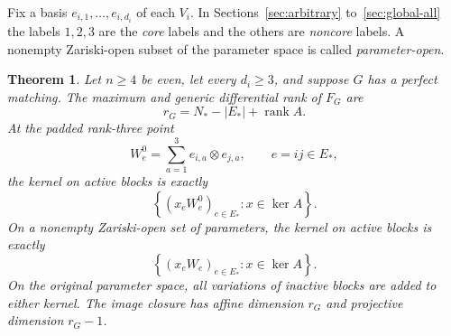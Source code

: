 \documentclass[11pt]{article}
\newtheorem{theorem}{Theorem}[section]
\theoremstyle{remark}\newtheorem{remark}[theorem]{Remark}
\DeclareMathOperator{\rank}{rank}
\begin{document}
Fix a basis $e_{i,1},\ldots,e_{i,d_i}$ of each $V_i$. In Sections~\ref{sec:arbitrary} to~\ref{sec:global-all} the labels $1,2,3$ are the \emph{core} labels and the others are \emph{noncore} labels. A nonempty Zariski-open subset of the parameter space is called \emph{parameter-open}.

\begin{theorem}\label{thm:arbitrary-support}
Let $n\geq4$ be even, let every $d_i\geq3$, and suppose $G$ has a perfect matching. The maximum and generic differential rank of $F_G$ are
\begin{equation}\label{eq:graph-rank}
 r_G=N_*-|E_*|+\rank A.
\end{equation}
At the \emph{padded rank-three point}
\begin{equation}\label{eq:base}
 W_e^0=\sum_{a=1}^3e_{i,a}\otimes e_{j,a},\qquad e=ij\in E_*,
\end{equation}
the kernel on active blocks is exactly
\begin{equation}\label{eq:graph-witness-kernel}
 \left\{(x_e W_e^0)_{e\in E_*}:x\in\ker A\right\}.
\end{equation}
On a nonempty Zariski-open set of parameters, the kernel on active
blocks is exactly
\begin{equation}\label{eq:graph-generic-kernel}
 \left\{(x_e W_e)_{e\in E_*}:x\in\ker A\right\}.
\end{equation}
On the original parameter space, all variations of inactive blocks
are added to either kernel. The image closure has affine dimension
$r_G$ and projective dimension $r_G-1$.
\end{theorem}
\end{document}
